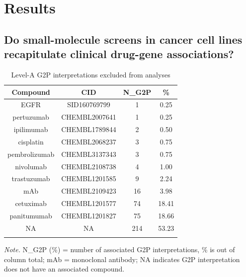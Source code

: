 \documentclass[man,floatsintext]{apa6}
\begin{document}
\section{Results}\label{results}

\subsection{Do small-molecule screens in cancer cell lines recapitulate
clinical drug-gene
associations?}\label{do-small-molecule-screens-in-cancer-cell-lines-recapitulate-clinical-drug-gene-associations}

\begin{table}[tbp]
\begin{center}
\begin{threeparttable}
\caption{\label{tab:table-g2p-nonCID}Level-A G2P interpretations excluded from analyses}
\small{
\begin{tabular}{cccc}
\toprule
Compound & \multicolumn{1}{c}{CID} & \multicolumn{1}{c}{N\_G2P} & \multicolumn{1}{c}{\%}\\
\midrule
EGFR & SID160769799 & 1 & 0.25\\
pertuzumab & CHEMBL2007641 & 1 & 0.25\\
ipilimumab & CHEMBL1789844 & 2 & 0.50\\
cisplatin & CHEMBL2068237 & 3 & 0.75\\
pembrolizumab & CHEMBL3137343 & 3 & 0.75\\
nivolumab & CHEMBL2108738 & 4 & 1.00\\
trastuzumab & CHEMBL1201585 & 9 & 2.24\\
mAb & CHEMBL2109423 & 16 & 3.98\\
cetuximab & CHEMBL1201577 & 74 & 18.41\\
panitumumab & CHEMBL1201827 & 75 & 18.66\\
NA & NA & 214 & 53.23\\
\bottomrule
\addlinespace
\end{tabular}
}
\begin{tablenotes}[para]
\normalsize{\textit{Note.} N\_G2P (\%) = number of associated G2P interpretations, \% is out of column total; mAb = monoclonal antibody; NA indicates G2P interpretation does not have an associated compound.}
\end{tablenotes}
\end{threeparttable}
\end{center}
\end{table}
\end{document}
